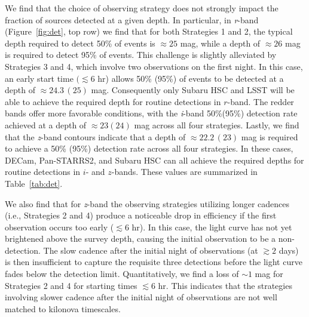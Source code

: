 We find that the choice of observing strategy does not strongly impact the fraction of sources detected at a given depth. In particular, in {\em r}-band (Figure~\ref{fig:det}, top row) we find that for both Strategies 1 and 2, the typical depth required to detect 50\% of events is $\approx25$ mag, while a depth of $\approx26$ mag is required to detect 95\% of events. This challenge is slightly alleviated by Strategies 3 and 4, which involve two observations on the first night. In this case, an early start time $(\lesssim 6$ hr) allows 50\% (95\%) of events to be detected at a depth of $\approx24.3\,(25)$ mag. Consequently only Subaru HSC and LSST will be able to achieve the required depth for routine detections in $r$-band. The redder bands offer more favorable conditions, with the {\em i}-band 50\%(95\%) detection rate achieved at a depth of $\approx 23(24)$ mag across all four strategies. Lastly, we find that the {\em z}-band contours indicate that a depth of $\approx22.2\,(23)$ mag is required to achieve a 50\% (95\%) detection rate across all four strategies. In these cases, DECam, Pan-STARRS2, and Subaru HSC can all achieve the required depths for routine detections in $i$- and $z$-bands.  These values are summarized in Table~\ref{tab:det}.

We also find that for {\em z}-band the observing strategies utilizing longer cadences (i.e., Strategies 2 and 4) produce a noticeable drop in efficiency if the first observation occurs too early ($\lesssim 6$ hr). In this case, the light curve has not yet brightened above the survey depth, causing the initial observation to be a non-detection. The slow cadence after the initial night of observations (at $\gtrsim2$ days) is then insufficient to capture the requisite three detections before the light curve fades below the detection limit. Quantitatively, we find a loss of $\sim 1$ mag for Strategies 2 and 4 for starting times $\lesssim 6$ hr. This indicates that the strategies involving slower cadence after the initial night of observations are not well matched to kilonova timescales. 

